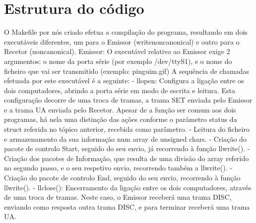 \documentclass[article, a4paper, 11pt, oneside]{memoir}
\begin{document}
\newpage
\chapter[Estrutura do código][Estrutura do código]{Estrutura do código} \label{\thechapter}

O Makefile por nós criado efetua a compilação do programa, resultando em dois executáveis diferentes, um para o Emissor (writenoncanonical) e outro para o Recetor (noncanonical).
Emissor:
O executável relativo ao Emissor exige 2 argumentos: o nome da porta série (por exemplo /dev/ttyS1), e o nome do ficheiro que vai ser transmitido (exemplo: pinguim.gif)
A sequência de chamadas efetuada por este executável é a seguinte:
 - llopen: Configura a ligação entre os dois computadores, abrindo a porta série em modo de escrita e leitura. Esta configuração decorre de uma troca de tramas, a trama SET enviada pelo Emissor e a trama UA enviada pelo Recetor. Apesar de a função ser comum aos dois programas, há nela uma distinção das ações conforme o parâmetro status da struct referida no tópico anterior, recebida como parâmetro.
 - Leitura do ficheiro e armazenamento da sua informação num array de unsigned chars.
 - Criação do pacote de controlo Start, seguido do seu envio, já recorrendo à função llwrite().
 - Criação dos pacotes de Informação, que resulta de uma divisão do array referido no segundo passo, e o seu respetivo envio, recorrendo também a llwrite().
 - Criação do pacote de controlo End, seguido do seu envio, recorrendo à função llwrite().
 - llclose(): Encerramento da ligação entre os dois computadores, através de uma troca de tramas. Neste caso, o Emissor receberá uma trama DISC, enviando como resposta outra trama DISC, e para terminar receberá uma trama UA.
\end{document}
